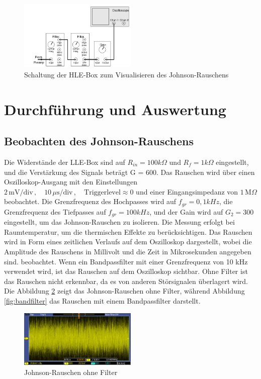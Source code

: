 \documentclass{article}
\begin{document}
\FloatBarrier
\begin{figure}[htbp]
    \centering
    \includegraphics[width=0.5\textwidth]{figs/johnson hle.png}
    \caption{Schaltung der HLE-Box zum Visualisieren des Johnson-Rauschens \cite{praktikum}}
    \label{fig:johnson hle}
\end{figure}
\FloatBarrier
\section{Durchführung und Auswertung}
\subsection{Beobachten des Johnson-Rauschens}
Die Widerstände der LLE-Box sind auf $R_{in} = 100 k\Omega$  und $R_f = 1 k\Omega$ eingestellt, und die Verstärkung des Signals beträgt G = 600. Das Rauschen wird über einen Oszilloskop-Ausgang mit den Einstellungen $2\,\text{mV/div} \,, \quad 10\,\mu\text{s/div} \,, \quad \text{Triggerlevel} \approx 0$ und einer Eingangsimpedanz von $1\,\text{M}\Omega$ beobachtet. Die Grenzfrequenz des Hochpasses wird auf $f_{gr} = 0,1 kHz$, die Grenzfrequenz des Tiefpasses auf $f_{gr} = 100 kHz$, und der Gain wird auf $G_2 = 300$ eingestellt, um das Johnson-Rauschen zu isolieren. Die Messung erfolgt bei Raumtemperatur, um die thermischen Effekte zu berücksichtigen. Das Rauschen wird in Form eines zeitlichen Verlaufs auf dem Oszilloskop dargestellt, wobei die Amplitude des Rauschens in Millivolt und die Zeit in Mikrosekunden angegeben sind.
 beobachtet. Wenn ein Bandpassfilter mit einer Grenzfrequenz von 10 kHz verwendet wird, ist das Rauschen auf dem Oszilloskop sichtbar. Ohne Filter ist das Rauschen nicht erkennbar, da es von anderen Störsignalen überlagert wird. Die Abbildung \ref{fig:johnson noise} zeigt das Johnson-Rauschen ohne Filter, während Abbildung \ref{fig:bandfilter} das Rauschen mit einem Bandpassfilter darstellt.
 \FloatBarrier
\begin{figure}[htbp]
    \centering
    \includegraphics[width=0.5\textwidth]{figs/johnson_noise_without_filter.png}
    \caption{Johnson-Rauschen ohne Filter}
    \label{fig:johnson noise}
\end{figure}
\FloatBarrier
\end{document}

